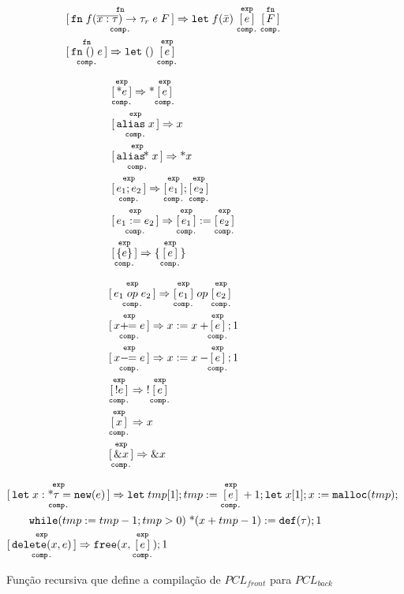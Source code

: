 \begin{figure}[ht]
	\caption{Função recursiva que define a compilação de $PCL_{front}$ para $PCL_{back}$}
	\label{fig:def:compilation}
	\begin{align}
		&\compf{\KW{fn}\;f(\overline{x : \tau})\to \tau_r\;e\;F} \Rightarrow \KW{let}\;f(\bar x)\; \compe{e}\; \compf{F} \\
		&\compf{\KW{fn}\;()\;e} \Rightarrow \KW{let}\;()\; \compe{e}
	\end{align}
	\begin{minipage}{.45\linewidth}
		\begin{align}
			&\compe{\text{*}e} \Rightarrow \text{*}\compe{e} \\
			&\compe{\KW{alias}\;x} \Rightarrow x \\
			&\compe{\KW{alias}\!\text{*}\;x} \Rightarrow \text{*}x \\
			&\compe{e_1;e_2} \Rightarrow \compe{e_1};\compe{e_2} \\
			&\compe{e_1 := e_2} \Rightarrow \compe{e_1} := \compe{e_2} \\
			&\compe{\{e\}} \Rightarrow \{\compe{e}\} 
		\end{align}
	\end{minipage}
	\hspace{.09\linewidth}
	\begin{minipage}{.45\linewidth}
		\begin{align}
			&\compe{e_1 \; op \; e_2} \Rightarrow \compe{e_1} \; op \; \compe{e_2}\\
			&\compe{x +\!\!= e} \Rightarrow x := x + \!\!\compe{e}; 1 \\
			&\compe{x -\!\!= e} \Rightarrow x := x - \!\!\compe{e}; 1 \\
			&\compe{!e} \Rightarrow\;!\compe{e} \\
			&\compe{x} \Rightarrow x \\
			&\compe{\&x} \Rightarrow \&x 
		\end{align}
	\end{minipage}
	\begin{align}
		&\compe{\KW{let}\; x: \text{*}\tau = \KW{new}(e)} \Rightarrow \KW{let}\;\TMP[1]; \TMP := \compe{e} + 1;\KW{let}\;x[1]; x := \KW{malloc}(\TMP);\nonumber\\
		&\quad\quad \KW{while}(\TMP := \TMP - 1; \TMP > 0)\; \text{*}(x + \TMP - 1) := \DEF; 1 \label{fig:def:compilation:new} \\
		&\compe{\KW{delete}(x, e)} \Rightarrow \KW{free}(x,\compe{e}); 1 \\

\end{align}
\end{figure}
